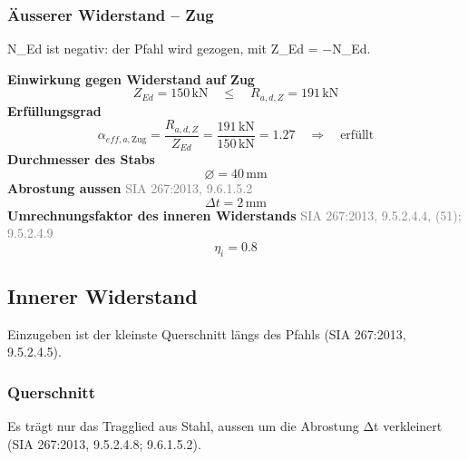\documentclass[11pt,a4paper]{article}
\newcommand{\normref}[1]{{\small\textcolor{gray}{#1}}}
\begin{document}
\subsubsection{Äusserer Widerstand – Zug}
N\_Ed ist negativ: der Pfahl wird gezogen, mit Z\_Ed = −N\_Ed.

\noindent\textbf{Einwirkung gegen Widerstand auf Zug}
\begin{equation*}
Z_{Ed} = 150\,\mathrm{kN} \quad \le \quad R_{a,d,Z} = 191\,\mathrm{kN}
\end{equation*}
\noindent\textbf{Erfüllungsgrad}
\begin{equation*}
\alpha_{eff,a,\text{Zug}} = \frac{R_{a,d,Z}}{Z_{Ed}} = \frac{191\,\mathrm{kN}}{150\,\mathrm{kN}} = 1.27 \quad \Rightarrow \quad \text{erfüllt}
\end{equation*}
\noindent\textbf{Durchmesser des Stabs}
\begin{equation*}
\varnothing = 40\,\mathrm{mm}
\end{equation*}
\noindent\textbf{Abrostung aussen} \hfill \normref{SIA 267:2013, 9.6.1.5.2}
\begin{equation*}
\Delta t = 2\,\mathrm{mm}
\end{equation*}
\noindent\textbf{Umrechnungsfaktor des inneren Widerstands} \hfill \normref{SIA 267:2013, 9.5.2.4.4, (51); 9.5.2.4.9}
\begin{equation*}
\eta_i = 0.8
\end{equation*}
\subsection{Innerer Widerstand}
Einzugeben ist der kleinste Querschnitt längs des Pfahls (SIA 267:2013, 9.5.2.4.5).

\subsubsection{Querschnitt}
Es trägt nur das Tragglied aus Stahl, aussen um die Abrostung Δt verkleinert (SIA 267:2013, 9.5.2.4.8; 9.6.1.5.2).
\end{document}
